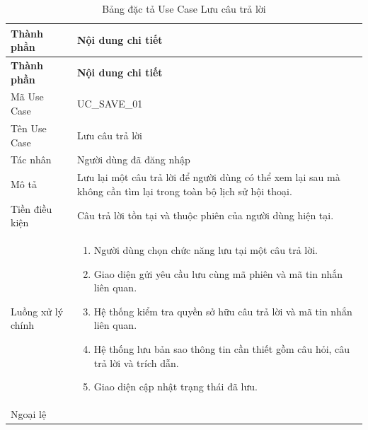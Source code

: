 \documentclass[12pt,a4paper,oneside]{report}
\begin{document}
{
  \begin{longtable}{|L{3.6cm}|L{11.2cm}|}
    \caption{Bảng đặc tả Use Case Lưu câu trả lời}\label{tab:uc-save}                                                                  \\
    \hline
    \textbf{Thành phần} & \textbf{Nội dung chi tiết}                                                                                     \\
    \hline
    \endfirsthead
    \hline
    \textbf{Thành phần} & \textbf{Nội dung chi tiết}                                                                                     \\
    \hline
    \endhead
    Mã Use Case       & UC\_SAVE\_01                                                                                                   \\
    \hline
    Tên Use Case      & Lưu câu trả lời                                                                                                \\
    \hline
    Tác nhân            & Người dùng đã đăng nhập                                                                                        \\
    \hline
    Mô tả               & Lưu lại một câu trả lời để người dùng có thể xem lại sau mà không cần tìm lại trong toàn bộ lịch sử hội thoại. \\
    \hline
    Tiền điều kiện      & Câu trả lời tồn tại và thuộc phiên của người dùng hiện tại.                                                    \\
    \hline
    Luồng xử lý chính   & \begin{enumerate}[leftmargin=*,nosep]
                            \item Người dùng chọn chức năng lưu tại một câu trả lời.
                            \item Giao diện gửi yêu cầu lưu cùng mã phiên và mã tin nhắn liên quan.
                            \item Hệ thống kiểm tra quyền sở hữu câu trả lời và mã tin nhắn liên quan.
                            \item Hệ thống lưu bản sao thông tin cần thiết gồm câu hỏi, câu trả lời và trích dẫn.
                            \item Giao diện cập nhật trạng thái đã lưu.
                          \end{enumerate}                           \\
    \hline
    Ngoại lệ            & \begin{enumerate}[leftmargin=*,nosep]

\end{enumerate}
\end{longtable}}
\end{document}
